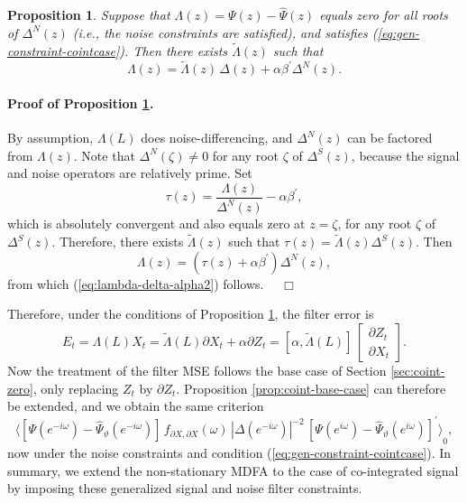 \documentclass[a4paper]{book}
\newtheorem{Proposition}{Proposition}
\begin{document}
\begin{Proposition}
\label{prop:gen-case-coint-factor}
 Suppose that $\Lambda (z) = \Psi (z) - \widehat{\Psi} (z)$ equals zero for
  all roots of $\Delta^N (z)$ (i.e., the noise constraints are satisfied),
  and satisfies (\ref{eq:gen-constraint-cointcase}).
  Then there exists $\widetilde{\Lambda} (z)$ such that
\begin{equation}
\label{eq:lambda-delta-alpha2}
 \Lambda (z) = \widetilde{\Lambda} (z) \, \Delta (z) + \alpha \beta^{\prime} \Delta^N (z).
\end{equation}
\end{Proposition}

\paragraph{Proof of Proposition \ref{prop:gen-case-coint-factor}.}
 By assumption, $\Lambda (L)$ does noise-differencing, and $\Delta^N (z)$ can be
  factored from $\Lambda (z)$.  Note that $\Delta^N (\zeta) \neq 0$ for any
  root $\zeta $ of $\Delta^S (z)$, because the signal and noise operators are relatively
   prime.  Set
  \[
   \tau (z) = \frac{ \Lambda (z) }{ \Delta^N (z)} - \alpha \beta^{\prime},
  \]
  which is absolutely convergent and also equals zero at $z = \zeta$, for any
   root $\zeta$ of $\Delta^S (z)$. Therefore, there exists $\widetilde{\Lambda} (z)$
    such that $\tau (z) = \widetilde{\Lambda} (z) \Delta^S (z)$. Then
  \[
   \Lambda (z) = \left( \tau (z) + \alpha \beta^{\prime} \right) \Delta^N (z), 
  \]
  from which (\ref{eq:lambda-delta-alpha2}) follows.  $\quad \Box$

\vspace{.5cm}

Therefore, under the conditions of Proposition \ref{prop:gen-case-coint-factor},
 the filter error is
 \[
  E_t = \Lambda (L) X_t = \widetilde{\Lambda} (L) \partial X_t + \alpha \partial Z_t
   = [ \alpha, \widetilde{\Lambda} (L) ] \, 
   \left[ \begin{array}{c} \partial Z_t \\ \partial X_t 
    \end{array} \right].
\]
 Now the treatment of the filter MSE follows the base case of
  Section  \ref{sec:coint-zero}, only replacing $Z_t$ by $\partial Z_t$.
  Proposition \ref{prop:coint-base-case} can therefore be extended,
  and we obtain the same criterion
\[
   { \langle  \left[ \Psi (e^{-i \omega}) - 
   \widehat{\Psi}_{\vartheta} (e^{-i \omega}) \right] \, 
 f_{\partial X, \partial X} (\omega) \, {|\Delta (e^{-i \omega}) |}^{-2} \,
  {  \left[ \Psi (e^{i \omega}) -  
  \widehat{\Psi}_{\vartheta} (e^{i \omega}) \right] }^{\prime} \rangle }_0,
\] 
  now under the noise constraints and condition 
 (\ref{eq:gen-constraint-cointcase}).
 In summary, we extend the non-stationary MDFA to the case of co-integrated signal
 by imposing these generalized signal and noise filter constraints.
 
\end{document}
